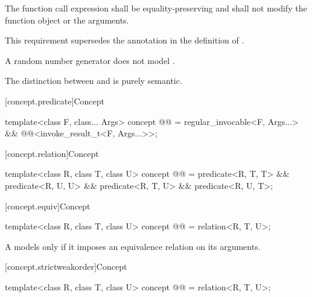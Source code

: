 \begin{itemdescr}
\pnum
The  function call expression shall be
equality-preserving and
shall not modify the function object or the arguments.
\begin{note}
This requirement supersedes the annotation in the definition of
.
\end{note}

\pnum
\begin{example}
A random number generator does not model .
\end{example}

\pnum
\begin{note}
The distinction between  and 
is purely semantic.
\end{note}
\end{itemdescr}

[concept.predicate]{Concept }

\begin{itemdecl}
template<class F, class... Args>
  concept @@ =
    regular_invocable<F, Args...> && @@<invoke_result_t<F, Args...>>;
\end{itemdecl}

[concept.relation]{Concept }

\begin{itemdecl}
template<class R, class T, class U>
  concept @@ =
    predicate<R, T, T> && predicate<R, U, U> &&
    predicate<R, T, U> && predicate<R, U, T>;
\end{itemdecl}

[concept.equiv]{Concept }

\begin{itemdecl}
template<class R, class T, class U>
  concept @@ = relation<R, T, U>;
\end{itemdecl}

\begin{itemdescr}
\pnum
A  models  only if
it imposes an equivalence relation on its arguments.
\end{itemdescr}

[concept.strictweakorder]{Concept }

\begin{itemdecl}
template<class R, class T, class U>
  concept @@ = relation<R, T, U>;
\end{itemdecl}

